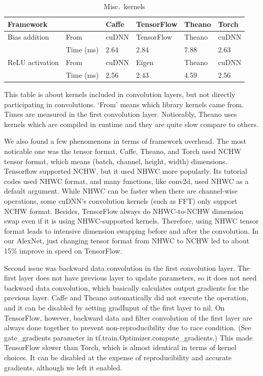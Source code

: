 \begin{table}[]
\centering
\caption{Misc.\ kernels}
\label{table_misc_kernel}
\begin{tabular}{llllll}
\multicolumn{2}{l}{Framework} & Caffe & TensorFlow & Theano & Torch \\ \hline
Bias addition    & From       & cuDNN & TensorFlow & Theano & cuDNN \\
                 & Time (ms)  & 2.64  & 2.84       & 7.88   & 2.63  \\
ReLU activation  & From       & cuDNN & Eigen      & Theano & cuDNN \\
                 & Time (ms)  & 2.56  & 2.43       & 4.59   & 2.56 
\end{tabular}

This table is about kernels included in convolution layers, but not directly participating in convolutions.
`From' means which library kernels came from.
Times are measured in the first convolution layer.
Noticeably, Theano uses kernels which are compiled in runtime and they are quite slow compare to others.
\end{table}

We also found a few phenomenons in terms of framework overhead.
The most noticable one was the tensor format.
Caffe, Theano, and Torch used NCHW tensor format, which means (batch, channel, height, width) dimensions.
Tensorflow supported NCHW, but it used NHWC more popularly.
Its tutorial codes used NHWC format, and many functions, like conv2d, used NHWC as a default argument.
While NHWC can be faster when there are channel-wise operations, some cuDNN's convolution kernels (such as FFT) only support NCHW format.
Besides, TensorFlow always do NHWC-to-NCHW dimension swap even if it is using NHWC-supported kernels.
Therefore, using NHWC tensor format leads to intensive dimension swapping before and after the convolution.
In our AlexNet, just changing tensor format from NHWC to NCHW led to about 15\% improve in speed on TensorFlow.

Second issue was backward data convolution in the first convolution layer.
The first layer does not have previous layer to update parameters, so it does not need backward data convolution, which basically calculates output gradients for the previous layer.
Caffe and Theano automatically did not execute the operation, and it can be disabled by setting gradInput of the first layer to nil.
On TensorFlow, however, backward data and filter convolution of the first layer are always done together to prevent non-reproducibility due to race condition. (See gate\_gradients parameter in tf.train.Optimizer.compute\_gradients.)
This made TensorFlow slower than Torch, which is almost identical in terms of kernel choices.
It can be disabled at the expense of reproducibility and accurate gradients, although we left it enabled.

